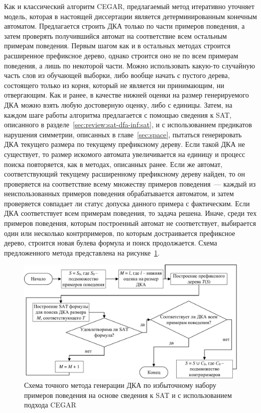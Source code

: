 Как и классический алгоритм CEGAR, предлагаемый метод итеративно уточняет модель, которая в настоящей диссертации является детерминированным конечным автоматом.
Предлагается строить ДКА только по части примеров поведения, а затем проверять получившийся автомат на соответствие всем остальным примерам поведения.
Первым шагом как и в остальных методах строится расширенное префиксное дерево, однако строится оно не по всем примерам поведения, а лишь по некоторой части.
Можно использовать какую-то случайную часть слов из обучающей выборки, либо вообще начать с пустого дерева, состоящего только из корня, который не является ни принимающим, ни отвергающим.
Как и ранее, в качестве нижней оценки на размер генерируемого ДКА можно взять любую достоверную оценку, либо с единицы. 
Затем, на каждом шаге работы алгоритма предлагается с помощью сведения к SAT, описанного в разделе~\ref{sec:review:sat-dfa-inf:sat}, и с использованием предикатов нарушения симметрии, описанных в главе~\ref{sec:space}, пытаться генерировать ДКА текущего размера по текущему префиксному дереву.
Если такой ДКА не существует, то размер искомого автомата увеличивается на единицу и процесс поиска повторяется, как в методах, описанных ранее.
Если же автомат, соответствующий текущему расширенному префиксному дереву найден, то он проверяется на соответствие всему множеству примеров поведения~--- каждый из неиспользованных примеров поведения обрабатывается автоматом, и затем проверяется совпадает ли статус допуска данного примера с фактическим.
Если ДКА соответствует всем примерам поведения, то задача решена.
Иначе, среди тех примеров поведения, которым построенный автомат не соответствует, выбирается один или несколько контрпримеров, по которым достраивается префиксное дерево, строится новая булева формула и поиск продолжается.
Схема предложенного метода представлена на рисунке~\ref{img:cegar-algo}.

\begin{figure}[ht]
  \centering
  \includegraphics[scale=0.85]{img/ntv/cegar.pdf}
  \caption{Схема точного метода генерации ДКА по избыточному набору примеров поведения на основе сведения к SAT и с использованием подхода CEGAR}
  \label{img:cegar-algo}
\end{figure}

